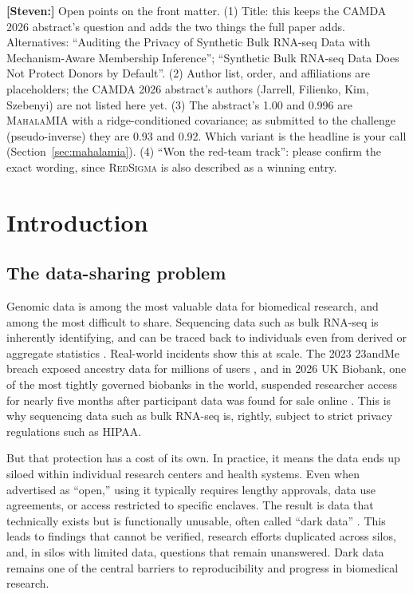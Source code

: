 \documentclass[webpdf,contemporary,large]{oup-authoring-template}
\newif\ifdraft \drafttrue
\newcommand{\annot}[3]{\ifdraft\textcolor{#1}{\textbf{[#2:]} #3}\fi}
\newcommand{\steven}[1]{\annot{Periwinkle}{Steven}{#1}}
\newcommand{\mahala}{\textsc{MahalaMIA}}
\newcommand{\redsigma}{\textsc{RedSigma}}
\begin{document}
\maketitle

\steven{Open points on the front matter. (1) Title: this keeps the CAMDA 2026 abstract's question and adds the two things the full paper adds. Alternatives: ``Auditing the Privacy of Synthetic Bulk RNA-seq Data with Mechanism-Aware Membership Inference''; ``Synthetic Bulk RNA-seq Data Does Not Protect Donors by Default''. (2) Author list, order, and affiliations are placeholders; the CAMDA 2026 abstract's authors (Jarrell, Filienko, Kim, Szebenyi) are not listed here yet. (3) The abstract's 1.00 and 0.996 are \mahala{} with a ridge-conditioned covariance; as submitted to the challenge (pseudo-inverse) they are 0.93 and 0.92. Which variant is the headline is your call (Section~\ref{sec:mahalamia}). (4) ``Won the red-team track'': please confirm the exact wording, since \redsigma{} is also described as a winning entry.}

\section{Introduction}
\label{sec:intro}

\subsection{The data-sharing problem}

Genomic data is among the most valuable data for biomedical research, and among the most difficult to share. Sequencing data such as bulk RNA-seq is inherently identifying, and can be traced back to individuals even from derived or aggregate statistics \citep{erlich2018identity,homer2008resolving}. Real-world incidents show this at scale. The 2023 23andMe breach exposed ancestry data for millions of users \citep{andme2023breach}, and in 2026 UK Biobank, one of the most tightly governed biobanks in the world, suspended researcher access for nearly five months after participant data was found for sale online \citep{kwon2026ukbiobank}. This is why sequencing data such as bulk RNA-seq is, rightly, subject to strict privacy regulations such as HIPAA.

But that protection has a cost of its own. In practice, it means the data ends up siloed within individual research centers and health systems. Even when advertised as ``open,'' using it typically requires lengthy approvals, data use agreements, or access restricted to specific enclaves. The result is data that technically exists but is functionally unusable, often called ``dark data'' \citep{watson2023delivering,mcdermott2021reproducibility}. This leads to findings that cannot be verified, research efforts duplicated across silos, and, in silos with limited data, questions that remain unanswered. Dark data remains one of the central barriers to reproducibility and progress in biomedical research.
\end{document}
